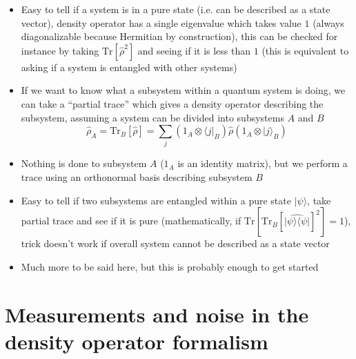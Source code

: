 \documentclass[english]{article}
\newcommand{\bra}[1]{\langle#1 |}
\newcommand{\ket}[1]{|#1 \rangle}
\newcommand{\ketbra}[2]{\vert #1 \rangle \! \langle #2 \vert}
\begin{document}
\begin{itemize}
\begin{itemize}
\begin{align}
\frac{\partial}{\partial t}(\ket{\psi}\bra{\psi})=-i[\hat{H},\ketbra{\psi}{\psi}]\Rightarrow \\
i\frac{\partial}{\partial t}\hat{\rho}=[\hat{H},\hat{\rho}]
\end{align}
\item This last equation is known as the von Neumann equation (or sometimes Liouville-von Neumann equation), and describes density matrix evolution in a closed system (identical to Schr{\"o}dinger evolution of each component)
\end{itemize}
\item Easy to tell if a system is in a pure state (i.e. can be described as a state vector), density operator has a single eigenvalue which takes value $1$ (always diagonalizable because Hermitian by construction), this can be checked for instance by taking $\mathrm{Tr}[\hat{\rho}^2]$ and seeing if it is less than $1$ (this is equivalent to asking if a system is entangled with other systems)
\item If we want to know what a subsystem within a quantum system is doing, we can take a ``partial trace'' which gives a density operator describing the subsystem, assuming a system can be divided into subsystems $A$ and $B$
\begin{equation}
\hat{\rho}_A=\mathrm{Tr}_B[\hat{\rho}]=\sum_j(1_A\otimes\bra{j}_B)\hat{\rho}(1_A\otimes\ket{j}_B)
\end{equation}
\item Nothing is done to subsystem $A$ ($1_A$ is an identity matrix), but we perform a trace using an orthonormal basis describing subsystem $B$
\item Easy to tell if two subsystems are entangled within a pure state $\ket{\psi}$, take partial trace and see if it is pure (mathematically, if $\mathrm{Tr}[\mathrm{Tr}_B[\hat{\ketbra{\psi}{\psi}}]^2]=1$), trick doesn't work if overall system cannot be described as a state vector
\item Much more to be said here, but this is probably enough to get started

\end{itemize}

\section{Measurements and noise in the density operator formalism}
\end{document}
